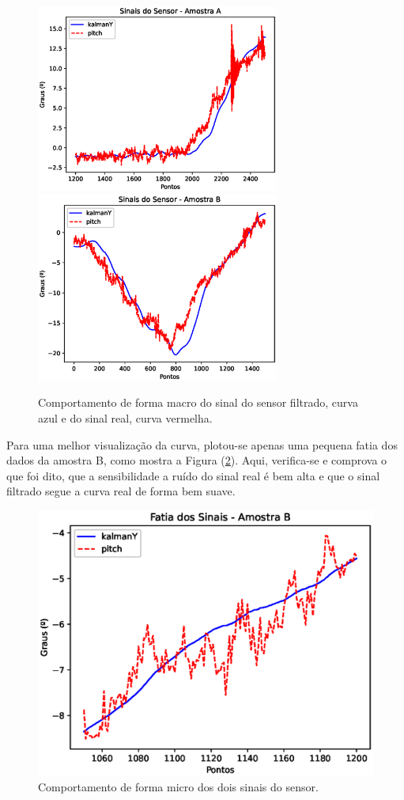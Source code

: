 \begin{figure}[H]
\centering
\includegraphics[width=8cm]{Resultados/sinaisAmostraA.eps}
\includegraphics[width=8cm]{Resultados/sinaisAmostraB.eps}
\caption{Comportamento de forma macro do sinal do sensor filtrado, curva azul e do sinal real, curva vermelha.}
\label{fig:sinaisMacroSensor} 
\end{figure}

Para uma melhor visualização da curva, plotou-se apenas uma pequena fatia dos dados da amostra B, como mostra a Figura (\ref{fig:sinaisFatiadoSensor}). Aqui, verifica-se e comprova o que foi dito, que a sensibilidade a ruído do sinal real é bem alta e que o sinal filtrado segue a curva real de forma bem suave.

\begin{figure}[H]
\centering
\includegraphics[scale=0.75]{Resultados/fatiaSinalSensor.eps}
\caption{Comportamento de forma micro dos dois sinais do sensor.}
\label{fig:sinaisFatiadoSensor} 
\end{figure}

